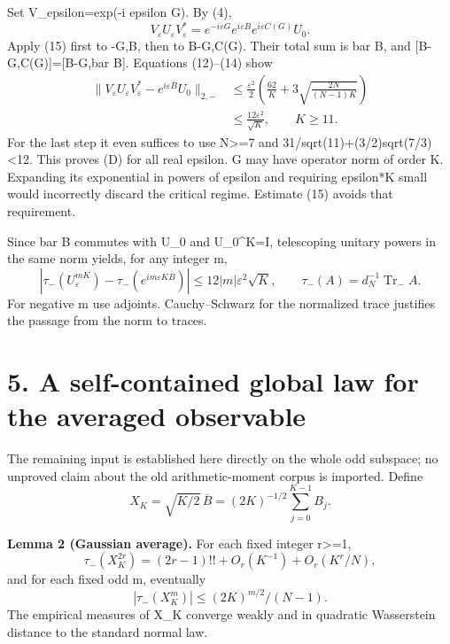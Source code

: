 \documentclass[11pt,a4paper]{article}
\begin{document}
Set V\_epsilon=exp(-i epsilon G). By (4), \[
 V_\varepsilon U_\varepsilon V_\varepsilon^*
 =e^{-i\varepsilon G}e^{i\varepsilon B}
       e^{i\varepsilon C(G)}U_0.
\] Apply (15) first to -G,B, then to B-G,C(G). Their total sum is bar B, and {[}B-G,C(G){]}={[}B-G,bar B{]}. Equations (12)--(14) show \[
 \begin{split}
 \|V_\varepsilon U_\varepsilon V_\varepsilon^*
       -e^{i\varepsilon\overline B}U_0\|_{2,-}
 &\leq\frac{\varepsilon^2}{2}
   \left(\frac{62}{K}+3\sqrt{\frac{2N}{(N-1)K}}\right)\\
 &\leq\frac{12\varepsilon^2}{\sqrt K},\qquad K\geq11.
 \end{split}\tag{16}
\] For the last step it even suffices to use N\textgreater=7 and 31/sqrt(11)+(3/2)sqrt(7/3)\textless12. This proves (D) for all real epsilon. G may have operator norm of order K. Expanding its exponential in powers of epsilon and requiring epsilon*K small would incorrectly discard the critical regime. Estimate (15) avoids that requirement.

Since bar B commutes with U\_0 and U\_0\^{}K=I, telescoping unitary powers in the same norm yields, for any integer m, \[
 \left|\tau_-(U_\varepsilon^{mK})
       -\tau_-(e^{im\varepsilon K\overline B})\right|
 \leq12|m|\varepsilon^2\sqrt K,\qquad
 \tau_-(A)=d_N^{-1}\operatorname{Tr}_{-}A.                      \tag{17}
\] For negative m use adjoints. Cauchy--Schwarz for the normalized trace justifies the passage from the norm to traces.

\hypertarget{a-self-contained-global-law-for-the-averaged-observable}{%
\section{5. A self-contained global law for the averaged observable}\label{a-self-contained-global-law-for-the-averaged-observable}}

The remaining input is established here directly on the whole odd subspace; no unproved claim about the old arithmetic-moment corpus is imported. Define \[
 X_K=\sqrt{K/2}\,\overline B=(2K)^{-1/2}\sum_{j=0}^{K-1}B_j.
\]

\textbf{Lemma 2 (Gaussian average).} For each fixed integer r\textgreater=1, \[
 \tau_-(X_K^{2r})=(2r-1)!!+O_r(K^{-1})+O_r(K^r/N),               \tag{18}
\] and for each fixed odd m, eventually \[
 |\tau_-(X_K^m)|\leq (2K)^{m/2}/(N-1).                         \tag{19}
\] The empirical measures of X\_K converge weakly and in quadratic Wasserstein distance to the standard normal law.
\end{document}
